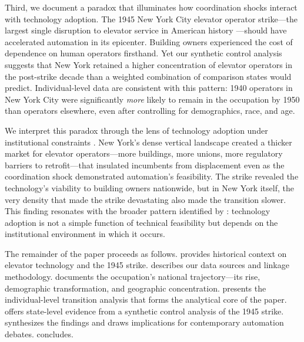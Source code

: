 \documentclass[12pt]{article}
\begin{document}
Third, we document a paradox that illuminates how coordination shocks interact with technology adoption. The 1945 New York City elevator operator strike---the largest single disruption to elevator service in American history \citep{gray2013}---should have accelerated automation in its epicenter. Building owners experienced the cost of dependence on human operators firsthand. Yet our synthetic control analysis suggests that New York retained a higher concentration of elevator operators in the post-strike decade than a weighted combination of comparison states would predict. Individual-level data are consistent with this pattern: 1940 operators in New York City were significantly \emph{more} likely to remain in the occupation by 1950 than operators elsewhere, even after controlling for demographics, race, and age.

We interpret this paradox through the lens of technology adoption under institutional constraints \citep{david1990, mokyr1992}. New York's dense vertical landscape created a thicker market for elevator operators---more buildings, more unions, more regulatory barriers to retrofit---that insulated incumbents from displacement even as the coordination shock demonstrated automation's feasibility. The strike revealed the technology's viability to building owners nationwide, but in New York itself, the very density that made the strike devastating also made the transition slower. This finding resonates with the broader pattern identified by \citet{comin2010}: technology adoption is not a simple function of technical feasibility but depends on the institutional environment in which it occurs.

The remainder of the paper proceeds as follows.  provides historical context on elevator technology and the 1945 strike.  describes our data sources and linkage methodology.  documents the occupation's national trajectory---its rise, demographic transformation, and geographic concentration.  presents the individual-level transition analysis that forms the analytical core of the paper.  offers state-level evidence from a synthetic control analysis of the 1945 strike.  synthesizes the findings and draws implications for contemporary automation debates.  concludes.


\end{document}
